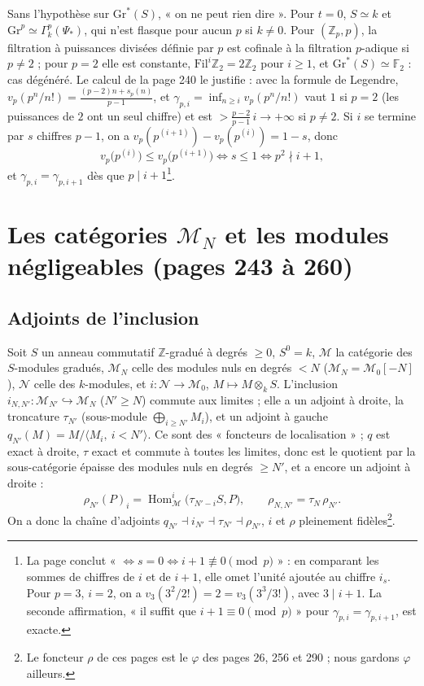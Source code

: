 \documentclass[11pt,a4paper]{article}
\begin{document}
Sans l'hypothèse sur $\mathrm{Gr}^*(S)$, « on ne peut rien dire ». Pour $t =
0$, $S \simeq k$ et $\mathrm{Gr}^p \simeq \Gamma^p_k(\Psi_*)$, qui n'est flasque
pour aucun $p$ si $k \neq 0$. Pour $(\mathbb{Z}_p, p)$, la filtration
à puissances divisées définie par $p$ est cofinale à la filtration $p$-adique si
$p \neq 2$ ; pour $p = 2$ elle est constante, $\mathrm{Fil}^i\mathbb{Z}_2 =
2\mathbb{Z}_2$ pour $i \geq 1$, et $\mathrm{Gr}^*(S) \simeq \mathbb{F}_2$ : cas
dégénéré. Le calcul de la page 240 le justifie : avec la formule de
Legendre, $v_p(p^n/n!) = \frac{(p-2)n + s_p(n)}{p-1}$, et
$\gamma_{p,i} = \inf_{n \geq i} v_p(p^n/n!)$ vaut $1$ si $p = 2$ (les puissances
de $2$ ont un seul chiffre) et est $> \frac{p-2}{p-1}\,i \to +\infty$ si $p
\neq 2$. Si $i$ se termine par $s$ chiffres $p - 1$, on a $v_p(p^{(i+1)}) -
v_p(p^{(i)}) = 1 - s$, donc
\[
v_p\bigl(p^{(i)}\bigr) \leq v_p\bigl(p^{(i+1)}\bigr) \iff s \leq 1 \iff p^2 \nmid i+1 ,
\]
et $\gamma_{p,i} = \gamma_{p,i+1}$ dès que $p \mid i+1$\footnote{La page
conclut « $\iff s = 0 \iff i+1 \not\equiv 0 \pmod p$ » : en comparant les sommes
de chiffres de $i$ et de $i+1$, elle omet l'unité ajoutée au chiffre $i_s$. Pour
$p = 3$, $i = 2$, on a $v_3(3^2/2!) = 2 = v_3(3^3/3!)$, avec $3 \mid i+1$. La
seconde affirmation, « il suffit que $i + 1 \equiv 0 \pmod p$ » pour
$\gamma_{p,i} = \gamma_{p,i+1}$, est exacte.}.

\section*{Les catégories $\mathcal{M}_N$ et les modules négligeables (pages 243 à 260)}

\subsection*{Adjoints de l'inclusion}

Soit $S$ un anneau commutatif $\mathbb{Z}$-gradué à degrés $\geq 0$, $S^0 = k$,
$\mathcal{M}$ la catégorie des $S$-modules gradués, $\mathcal{M}_N$ celle des
modules nuls en degrés $< N$ ($\mathcal{M}_N = \mathcal{M}_0[-N]$),
$\mathcal{N}$ celle des $k$-modules, et $i : \mathcal{N} \to \mathcal{M}_0$, $M
\mapsto M \otimes_k S$. L'inclusion $i_{N,N'} : \mathcal{M}_{N'} \hookrightarrow
\mathcal{M}_N$ ($N' \geq N$) commute aux limites ; elle a un adjoint à droite,
la troncature $\tau_{N'}$ (sous-module $\bigoplus_{i \geq N'} M_i$), et un
adjoint à gauche $q_{N'}(M) = M/\langle M_i,\ i < N'\rangle$. Ce sont des
« foncteurs de localisation » ; $q$ est exact à droite, $\tau$ exact et commute
à toutes les limites, donc est le quotient par la sous-catégorie épaisse des
modules nuls en degrés $\geq N'$, et a encore un adjoint à droite :
\[
\rho_{N'}(P)_i = \operatorname{Hom}^i_{\mathcal{M}}\bigl(\tau_{N'-i}S, P\bigr) , \qquad \rho_{N,N'} = \tau_N\,\rho_{N'} .
\]
On a donc la chaîne d'adjoints $q_{N'} \dashv i_{N'} \dashv \tau_{N'} \dashv
\rho_{N'}$, $i$ et $\rho$ pleinement fidèles\footnote{Le foncteur $\rho$ de
ces pages est le $\varphi$ des pages 26, 256 et 290 ; nous gardons $\varphi$
ailleurs.}.
\end{document}
